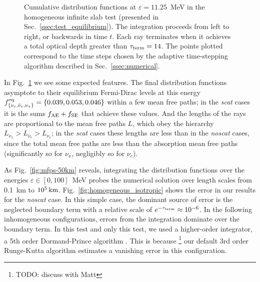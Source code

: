 \documentclass[aps,floatfix,prd,superscriptaddress,twocolumn]{revtex4-1}
\begin{document}
\begin{figure}
  \resizebox{\columnwidth}{!}{}
  \caption{Cumulative distribution functions at $\varepsilon=11.25$~MeV
    in the homogeneous infinite slab test
    (presented in Sec.~\ref{ssec:test_equilibrium}).
    The integration proceeds from left to right, or backwards in time $t$.
    Each ray terminates when it achieves a total optical depth
    greater than $\tau_{\rm term}=14$.
    The points plotted correspond to the time steps chosen by the adaptive
    time-stepping algorithm described in Sec.~\ref{ssec:numerical}.
  }
  \label{fig:cumulative_f_homogeneous}
\end{figure}

In Fig.~\ref{fig:cumulative_f_homogeneous} we see some expected features.
The final distribution functions asymptote to their equilibrium Fermi-Dirac
levels at this energy
$f^{\rm eq}_{\{\nu_e,\bar{\nu}_e,\nu_x\}}=\{0.039, 0.053, 0.046\}$
within a few mean free paths;
in the \emph{scat} cases it is the sums $f_{\rm AE}+f_{\rm SE}$ that
achieve these values.
And the lengths of the rays are proportional to the mean free paths $L$,
which obey the hierarchy $L_{\nu_x}>L_{\bar{\nu}_e}>L_{\nu_e}$;
in the \emph{scat} cases these lengths are less than in the \emph{noscat} cases,
since the total mean free paths are less than the absorption mean free paths
(significantly so for $\nu_x$, negligibly so for $\nu_e$).

As Fig.~\ref{fig:mfps-50km} reveals, integrating the distribution functions
over the energies $\varepsilon\in[0,100]$~MeV
probes the numerical solution over length scales from
0.1~km to $10^{5}\,{\rm km}$.
Fig.~\ref{fig:homogeneous_isotropic} shows the error in our results for
the \emph{noscat} case.
In this simple case, the dominant source of error is the neglected
boundary term with a relative scale of $e^{-\tau_{\rm term}}\approx10^{-6}$.
In the following inhomogeneous configurations,
errors from the integration dominate over the boundary term.
In this test and only this test, we used a higher-order integrator, a 5th
order Dormand-Prince algorithm \cite{pres2007-nr_3rd_ed}. This is because
\footnote{TODO: discuss with Matt}
our default 3rd order Runge-Kutta algorithm estimates a vanishing error
in this configuration.
\end{document}
